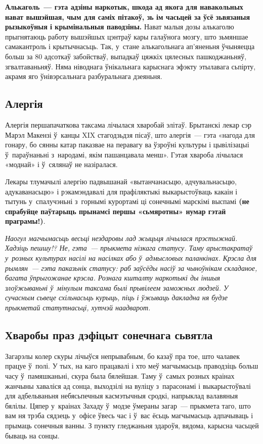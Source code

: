 \textbf{Алькаголь~--- гэта адзіны наркотык, шкода ад якога для навакольных нават вышэйшая, чым для саміх пітакоў, зь ім часьцей за ўсё зьвязаныя рызыкоўныя і крымінальныя паводзіны.} Нават малыя дозы алькаголю прыгнятаюць работу вышэйшых цэнтраў кары галаўнога мозгу, што зьмяншае самакантроль і крытычнасьць. Так, у~стане алькагольнага ап'яненьня ўчыняецца больш за 80 адсоткаў забойстваў, выпадкаў цяжкіх цялесных пашкоджаньняў, згвалтаваньняў. Няма ніводнага ўнікальнага карыснага эфэкту этылавага сьпірту, акрамя яго ўнівэрсальнага разбуральнага дзеяньня.

\subsection*{Алергія}

Алергія першапачаткова таксама лічылася хваробай элітаў. Брытанскі лекар сэр Марэл Макензі ў~канцы XIX стагодзьдзя пісаў, што алергія~--- гэта «нагода для гонару, бо сянны катар паказвае на перавагу ва ўзроўні культуры і цывілізацыі ў~параўнаньні з~народамі, якім пашанцавала менш». Гэтая хвароба лічылася «моднай» і ў~сялянаў не назіралася.

Лекары тлумачылі алергію падвышанай «вытанчанасьцю, адчувальнасьцю, адукаванасьцю» і рэкамэндавалі для прафіляктыкі выкарыстоўваць какаін і тытунь у~спалучэньні з~горнымі курортамі ці сонечнымі марскімі выспамі \textbf{(не спрабуйце паўтарыць прынамсі першы «сьмяротны» нумар гэтай праграмы!)}.

\emph{Наогул магчымасьць весьці нездаровы лад жыцьця лічылася прэстыжнай. Хадзіць пешшу!? Не, гэта~--- прыкмета нізкага статусу. Таму арыстакратаў у~розных культурах насілі на насілках або ў~адмысловых паланкінах. Крэсла для рымлян~--- гэта паказьнік статусу: раб заўсёды насіў за чыноўнікам складаное, багата ўпрыгожанае крэсла. Рознага кшталту наркотыкі ды іншыя злоўжываньні ў~мінулым таксама былі прывілеем заможных людзей. У сучасным сьвеце схільнасьць курыць, піць і ўжываць дакладна ня будзе прыкметай статутнасьці, хутчэй наадварот.}

\subsection*{Хваробы праз дэфіцыт сонечнага сьвятла}

Загарэлы колер скуры лічыўся непрывабным, бо казаў пра тое, што чалавек працуе ў~полі. У тых, на каго працавалі і хто меў магчымасьць праводзіць больш часу ў~памяшканьні, скура была бялейшая. Таму ў~самых розных краінах жанчыны хаваліся ад сонца, выходзілі на вуліцу з~парасонамі і выкарыстоўвалі для адбельваньня небясьпечныя касмэтычныя сродкі, напрыклад валавяныя бялілы. Цяпер у~краінах Захаду ў~модзе ўмераны загар~--- прыкмета таго, што вам ня трэба сядзець у~офісе ўвесь час і ў~вас ёсьць магчымасьць адпачываць і прымаць сонечныя ванны. З пункту гледжаньня здароўя, вядома, карысна часьцей бываць на сонцы.

